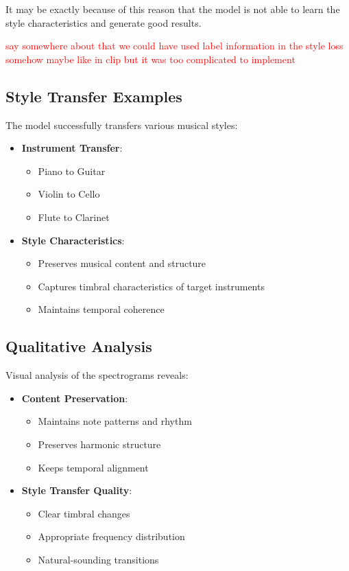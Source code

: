 \noindent It may be exactly because of this reason that the model is not able to learn the style characteristics and generate good results.

\textcolor{red}{say somewhere about that we could have used label information in the style loss somehow maybe like in clip but it was too complicated to implement}

\subsection{Style Transfer Examples}
The model successfully transfers various musical styles:

\begin{itemize}
    \item \textbf{Instrument Transfer}:
    \begin{itemize}
        \item Piano to Guitar
        \item Violin to Cello
        \item Flute to Clarinet
    \end{itemize}
    
    \item \textbf{Style Characteristics}:
    \begin{itemize}
        \item Preserves musical content and structure
        \item Captures timbral characteristics of target instruments
        \item Maintains temporal coherence
    \end{itemize}
\end{itemize}

\subsection{Qualitative Analysis}
Visual analysis of the spectrograms reveals:

\begin{itemize}
    \item \textbf{Content Preservation}:
    \begin{itemize}
        \item Maintains note patterns and rhythm
        \item Preserves harmonic structure
        \item Keeps temporal alignment
    \end{itemize}
    
    \item \textbf{Style Transfer Quality}:
    \begin{itemize}
        \item Clear timbral changes
        \item Appropriate frequency distribution
        \item Natural-sounding transitions
    \end{itemize}
\end{itemize}

